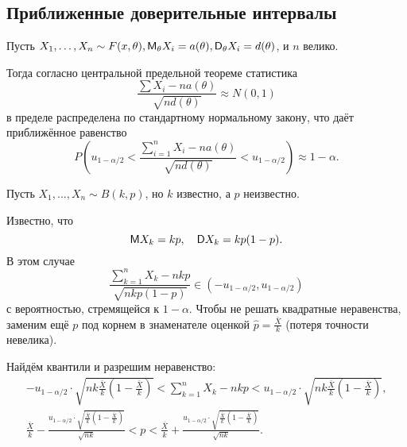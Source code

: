 \subsection{Приближенные доверительные интервалы}
  Пусть $X_1, \dots, X_n \sim F(x, \theta), \mathsf M_\theta X_i = a(\theta), \mathsf D_\theta
	X_i = d(\theta)$, и $n$ велико. 

	Тогда согласно центральной предельной теореме статистика
\[
	\frac{\sum X_i - n a(\theta)}{\sqrt{n d(\theta)}} \approx N(0, 1)
\]
в пределе распределена по стандартному нормальному закону, что даёт приближённое
равенство
\[
	P\left(u_{1 - \alpha/2} < \frac{\sum_{i=1}^n X_i - n a(\theta)}{\sqrt{n d(\theta)}}<
	u_{1-\alpha/2}\right) \approx 1 - \alpha.
\]

\begin{ex}
  Пусть $X_1, \dots, X_n \sim B(k, p)$, но $k$ известно, а $ p $ неизвестно.

	Известно, что 
	\[
		\mathsf M X_k = kp, \quad \mathsf D X_k = k p (1-p).
	\]
В этом случае
\[
	\frac{\sum_{k=1}^n X_k - n k p}{\sqrt{nkp(1-p)}} \in (-u_{1-\alpha/2}, u_{1-\alpha/2})
\]
с вероятностью, стремящейся к $ 1 - \alpha $. Чтобы не решать квадратные
неравенства, заменим ещё $ p $ под корнем в
знаменателе оценкой $\hat p = \frac{\bar X}{k}$ (потеря точности невелика). 

Найдём квантили и разрешим неравенство:
\begin{gather*}
	-u_{1-\alpha/2}\cdot \sqrt{nk \frac{\bar X}{k} \left(1 - \frac{\bar X}{k}\right)} <
	\sum_{k=1}^n X_k -
	nkp < u_{1-\alpha/2} \cdot \sqrt{nk \frac{\bar X}{k} \left(1 - \frac{\bar X}{k}\right)}, \\
	\frac{\bar X}{k} - \frac{u_{1-\alpha/2}\cdot \sqrt{\frac{\bar X}{k} \left(1 - \frac{\bar
	X}{k}\right)}}{\sqrt{nk}} < p < \frac{\bar X}{k} + \frac{u_{1-\alpha/2}
\cdot \sqrt{\frac{\bar X}{k} \left(1 - \frac{\bar X}{k}\right)}}{\sqrt{nk}}.
\end{gather*}
\end{ex}
